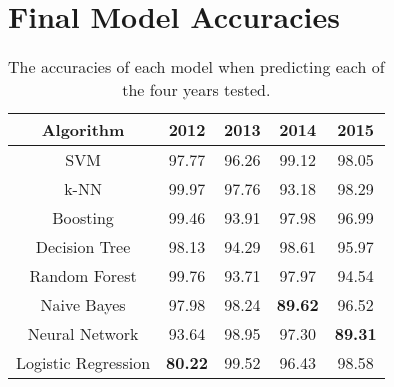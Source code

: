 \documentclass[titlepage]{article}
\begin{document}
\section{Final Model Accuracies}
\label{app:modelAccuracies}
\vspace*{\fill}
\begin{table}[!hb]
\begin{center}
\begin{tabular}{|c|c|c|c|c|}\hline
	\textbf{Algorithm}	&\textbf{2012}	&\textbf{2013}	&\textbf{2014}	&\textbf{2015}\\\hline
	SVM					&97.77			&96.26			&99.12			&98.05\\\hline
	k-NN				&99.97			&97.76			&93.18			&98.29\\\hline
	Boosting			&99.46			&93.91			&97.98			&96.99\\\hline
	Decision Tree		&98.13			&94.29			&98.61			&95.97\\\hline
	Random Forest		&99.76			&93.71			&97.97			&94.54\\\hline
	Naive Bayes			&97.98			&98.24			&\textbf{89.62}	&96.52\\\hline
	Neural Network		&93.64			&98.95			&97.30			&\textbf{89.31}\\\hline
	Logistic Regression	&\textbf{80.22}	&99.52			&96.43			&98.58\\\hline
\end{tabular}
\caption{The accuracies of each model when predicting each of the four years tested.}
\end{center}
\end{table}
\vspace*{\fill}
\newpage
\end{document}
